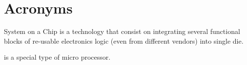 \chapter{Acronyms}

\begin{acronym}
 System on a Chip is a technology that consist on integrating several functional blocks of re-usable electronics logic (even from different vendors) into single die.

 is a special type of micro processor.

\end{acronym}

